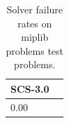 \begin{table}
\centering
\caption{Solver failure rates on miplib problems test problems.}
\label{t-miplib problems test-failure}
\begin{tabular}{lc}
\toprule
 SCS-3.0 \\
\midrule
    0.00 \\
\bottomrule
\end{tabular}
\end{table}
